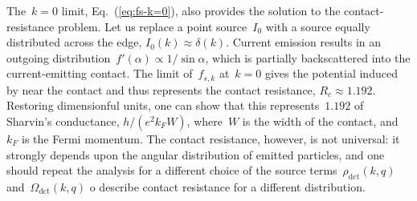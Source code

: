 \documentclass[preprint,aps,eqsecnum, prb]{revtex4-1}
\newcommand{\dct}[1]{{#1}_\mathrm{dct}}
\begin{document}
The~$k = 0$ limit, Eq.~(\ref{eq:fs-k=0}), also provides the solution
to the contact-resistance problem. Let us replace a point source~$I_0$
with  a source equally distributed across the edge,
$I_0(k) \approx \delta(k)$. Current emission results in
an outgoing distribution~$f'(\alpha) \propto 1/\sin\alpha$,
which is partially backscattered into the current-emitting contact.
The limit of~$f_{s, k}$ at~$k = 0$ gives the potential induced by
near the contact and thus represents the contact resistance,
$R_c \approx 1.192$. Restoring  dimensionful units, one can show
that this represents~$1.192$ of Sharvin's conductance, $h/(e^2 k_F W)$,
where~$W$ is the width of the contact, and~$k_F$ is the Fermi momentum.
The contact resistance, however, is not universal:
it strongly depends upon the angular distribution
of emitted particles, and one should repeat the analysis for a different
choice of the source terms~$\dct{\rho}(k, q)$ and~$\dct{\Omega}(k, q)$
o describe contact resistance for a different distribution.

\end{document}

